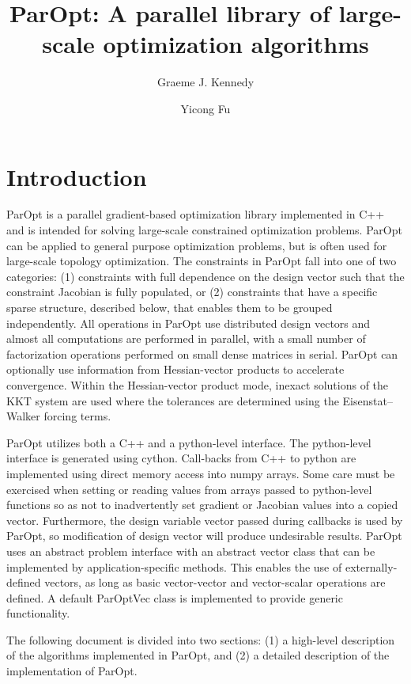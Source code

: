 \documentclass[12pt]{article}
\title{ParOpt: A parallel library of large-scale optimization algorithms}
\author{Graeme J. Kennedy \and Yicong Fu}
\date{}
\begin{document}
\maketitle

\section{Introduction}

ParOpt is a parallel gradient-based optimization library implemented in C++ and is intended for solving large-scale constrained optimization problems.
ParOpt can be applied to general purpose optimization problems, but is often used for large-scale topology optimization.
The constraints in ParOpt fall into one of two categories: (1) constraints with full dependence on the design vector such that the constraint Jacobian is fully populated, or (2) constraints that have a specific sparse structure, described below, that enables them to be grouped independently.
All operations in ParOpt use distributed design vectors and almost all computations are performed in parallel, with a small number of factorization operations performed on small dense matrices in serial.
ParOpt can optionally use information from Hessian-vector products to accelerate convergence.
Within the Hessian-vector product mode, inexact solutions of the KKT system are used where the tolerances are determined using the Eisenstat--Walker forcing terms.

ParOpt utilizes both a C++ and a python-level interface.
The python-level interface is generated using cython.
Call-backs from C++ to python are implemented using direct memory access into numpy arrays.
Some care must be exercised when setting or reading values from arrays passed to python-level functions so as not to inadvertently set gradient or Jacobian values into a copied vector.
Furthermore, the design variable vector passed during callbacks is used by ParOpt, so modification of design vector will produce undesirable results.
ParOpt uses an abstract problem interface with an abstract vector class that can be implemented by application-specific methods.
This enables the use of externally-defined vectors, as long as basic vector-vector and vector-scalar operations are defined.
A default ParOptVec class is implemented to provide generic functionality.

The following document is divided into two sections: (1) a high-level description of the algorithms implemented in ParOpt, and (2) a detailed description of the implementation of ParOpt.
\end{document}
